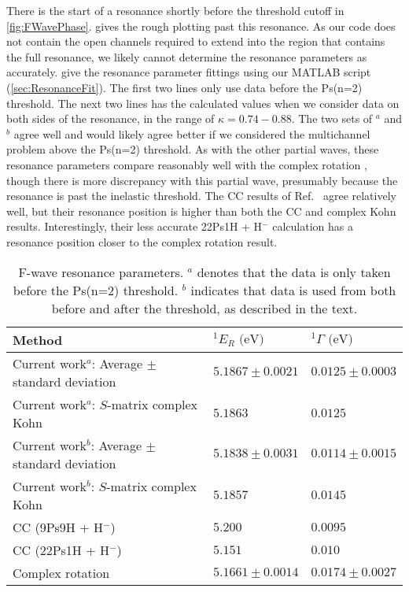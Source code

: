 \documentclass[Dissertation.tex]{subfiles}
\begin{document}
There is the start of a resonance shortly before the threshold cutoff in 
\cref{fig:FWavePhase}.  gives the rough 
plotting past this resonance. As our code does not contain the open channels 
required to extend into the region that contains the full resonance, 
we likely cannot determine the resonance parameters as accurately.
 give the resonance 
parameter fittings using our MATLAB script (\cref{sec:ResonanceFit}).
The first two lines only use data before the Ps(n=2) threshold. The next
two lines has the calculated values when we consider data on both sides of the
resonance, in the range of $\kappa = 0.74 - 0.88$. The two sets of $^a$ and
$^b$ agree well and would likely agree better if we considered the multichannel
problem above the Ps(n=2) threshold.
As with the other partial
waves, these resonance parameters compare reasonably well with the complex
rotation \cite{Ho2000}, though there is more discrepancy with this partial
wave, presumably because the resonance is past the inelastic threshold.
The CC results of Ref.~\cite{Walters2004} agree relatively well, but their
resonance position is higher than both the CC and complex Kohn results.
Interestingly, their less accurate 22Ps1H + H$^-$ calculation
\cite{Blackwood2002b} has a resonance position closer to the complex rotation
result.

\setlength{\abovecaptionskip}{6pt}   %
\setlength{\belowcaptionskip}{6pt}   %
\begin{table}
\centering
\begin{tabular}{l l l}
\toprule
Method & $^1E_R \text{ (eV)}$ & $^1\Gamma \text{ (eV)}$ \\
\midrule
Current work$^a$: Average $\pm$ standard deviation & $5.1867 \pm 0.0021$ & $0.0125 \pm 0.0003$ \\
Current work$^a$: $S$-matrix complex Kohn & $5.1863$ & $0.0125$ \\
Current work$^b$: Average $\pm$ standard deviation & $5.1838 \pm 0.0031$ & $0.0114 \pm 0.0015$ \\
Current work$^b$: $S$-matrix complex Kohn & $5.1857$ & $0.0145$ \\
CC (9Ps9H + H$^-$) \cite{Walters2004} & $5.200$ & $0.0095$ \\
CC (22Ps1H + H$^-$) \cite{Blackwood2002b} & $5.151$ & $0.010$ \\
Complex rotation \cite{Ho2000} & $5.1661 \pm 0.0014$ & $0.0174 \pm 0.0027$  \\
\bottomrule
\end{tabular}
\caption[F-wave resonance parameters]{F-wave resonance parameters. $^a$ denotes that the data is only taken before the Ps(n=2) threshold.
$^b$ indicates that data is used from both before and after the threshold, as described in the text.}
\label{tab:FWaveResonanceComparisons}
\end{table}
\end{document}
